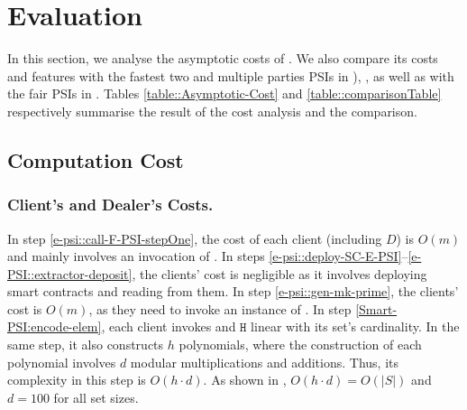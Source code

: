 

\vspace{-4mm}

\section{Evaluation}\label{sec::valuation}

\vspace{-3mm}

In this section, we analyse the asymptotic costs of \epsi. We also compare its costs and features with the fastest two and multiple parties PSIs in \cite{AbadiDMT22,DBLP:conf/ccs/KolesnikovMPRT17,NevoTY21,RaghuramanR22}), , as well as with the fair PSIs in \cite{DebnathD16,DBLP:conf/dbsec/DongCCR13}. Tables \ref{table::Asymptotic-Cost} and \ref{table::comparisonTable} respectively summarise the result of the cost analysis and the comparison. 

\vspace{-6mm}


\vspace{-4.5mm}


\vspace{-5.5mm}
\subsection{Computation Cost}

\vspace{-1mm}
\subsubsection{Client's and Dealer's Costs.}

In step \ref{e-psi::call-F-PSI-stepOne}, the cost of each client (including $D$) is $O(m)$ and mainly involves an invocation of \ct. 
% 
In steps \ref{e-psi::deploy-SC-E-PSI}--\ref{e-PSI::extractor-deposit}, the clients' cost is negligible as it involves deploying smart contracts and reading from them. 
%
In step \ref{e-psi::gen-mk-prime}, the clients' cost is  $O(m)$, as they need to invoke an instance of \ct. 
%
In step \ref{Smart-PSI:encode-elem}, each client invokes \prp and $\mathtt{H}$ linear with its set's cardinality. In the same step, it also constructs $h$ polynomials, where the construction of each polynomial involves $d$  modular multiplications and additions. Thus, its complexity in this step is $O(h\cdot d)$. As shown in \cite{AbadiDMT22},  $O(h\cdot d)=O(|S|)$ and  $d=100$ for all set sizes. 
%


